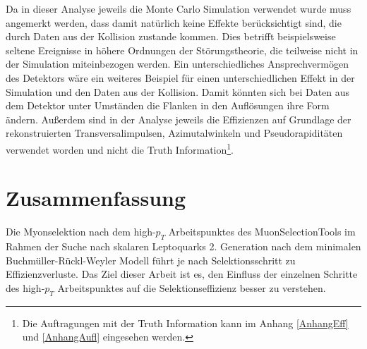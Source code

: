 Da in dieser Analyse jeweils die Monte Carlo Simulation verwendet wurde muss angemerkt werden, dass damit natürlich keine Effekte berücksichtigt sind, die durch Daten aus der Kollision zustande kommen. Dies betrifft beispielsweise seltene Ereignisse in höhere Ordnungen der Störungstheorie, die teilweise nicht in der Simulation miteinbezogen werden. Ein unterschiedliches Ansprechvermögen des Detektors wäre ein weiteres Beispiel für einen unterschiedlichen Effekt in der Simulation und den Daten aus der Kollision. Damit könnten sich bei Daten aus dem Detektor unter Umständen die Flanken in den Auflösungen ihre Form ändern. Außerdem sind in der Analyse jeweils die Effizienzen auf Grundlage der rekonstruierten Transversalimpulsen, Azimutalwinkeln und Pseudorapiditäten verwendet worden und nicht die Truth Information\footnote{Die Auftragungen mit der Truth Information kann im Anhang \ref{AnhangEff} und \ref{AnhangAufl} eingesehen werden.}.  
%
%
%
%
%
%
%
%
\chapter{Zusammenfassung}%
\enlargethispage{60mm}%
Die Myonselektion nach dem high-$p_T$ Arbeitspunktes des MuonSelectionTools im Rahmen der Suche nach skalaren Leptoquarks 2. Generation nach dem minimalen Buchmüller-Rückl-Weyler Modell führt je nach Selektionsschritt zu Effizienzverluste. Das Ziel dieser Arbeit ist es, den Einfluss der einzelnen Schritte des high-$p_T$ Ar\-beits\-punktes auf die Selektionseffizienz besser zu verstehen. 

